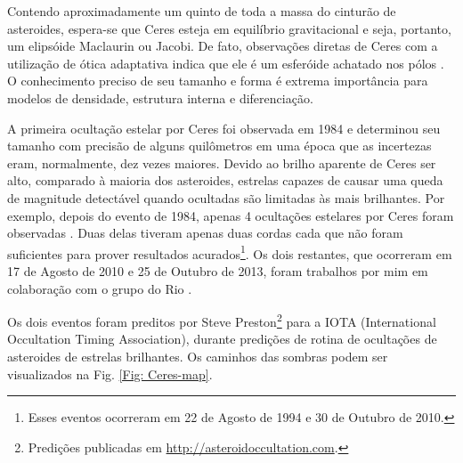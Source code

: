 \documentclass[12pt,a4paper]{monografia}
\begin{document}
Contendo aproximadamente um quinto de toda a massa do cinturão de asteroides, espera-se que Ceres esteja em equilíbrio gravitacional e seja, portanto, um elipsóide Maclaurin ou Jacobi. De fato, observações diretas de Ceres com a utilização de ótica adaptativa indica que ele é um esferóide achatado nos pólos \citep{Drummond2014}. O conhecimento preciso de seu tamanho e forma é extrema importância para modelos de densidade, estrutura interna e diferenciação.

A primeira ocultação estelar por Ceres foi observada em 1984 \citep{Millis1987} e determinou seu tamanho com precisão de alguns quilômetros em uma época que as incertezas eram, normalmente, dez vezes maiores. Devido ao brilho aparente de Ceres ser alto, comparado à maioria dos asteroides, estrelas capazes de causar uma queda de magnitude detectável quando ocultadas são limitadas às mais brilhantes. Por exemplo, depois do evento de 1984, apenas 4 ocultações estelares por Ceres foram observadas \citep{Dunham2014}. Duas delas tiveram apenas duas cordas cada que não foram suficientes para prover resultados acurados\footnote{Esses eventos ocorreram em 22 de Agosto de 1994 e 30 de Outubro de 2010.}. Os dois restantes, que ocorreram em 17 de Agosto de 2010 e 25 de Outubro de 2013, foram trabalhos por mim em colaboração com o grupo do Rio \citep[aceito]{GomesJunior2015-Ceres}.

Os dois eventos foram preditos por Steve Preston\footnote{Predições publicadas em \url{http://asteroidoccultation.com}.} para a IOTA (International Occultation Timing Association), durante predições de rotina de ocultações de asteroides de estrelas brilhantes. Os caminhos das sombras podem ser visualizados na Fig. \ref{Fig: Ceres-map}.
\end{document}
